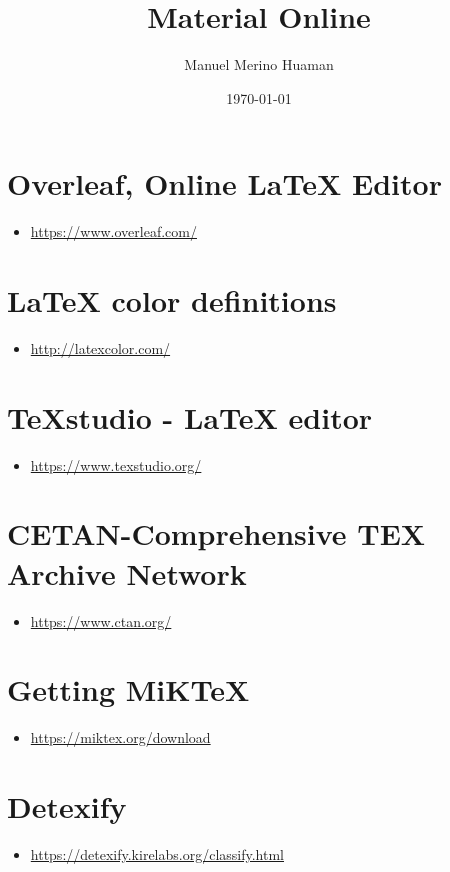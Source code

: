 \documentclass[11pt,a4paper]{article}
\title{Material Online}
\author{Manuel Merino Huaman}
\date{\today}
\begin{document}
     \maketitle
     \begin{abstract}
         \lipsum[1]
     \end{abstract}
   
     \section{Overleaf, Online LaTeX Editor}
         \begin{itemize}
             \item \textcolor{blue!85}{\url{https://www.overleaf.com/}}
         \end{itemize}
   
     \section{LaTeX color definitions}
         \begin{itemize}
             \item \textcolor{blue!85}{\url{http://latexcolor.com/}}
         \end{itemize}

     \section{TeXstudio - LaTeX editor}
         \begin{itemize}
             \item \textcolor{blue!85}{\url{https://www.texstudio.org/}}
         \end{itemize}
   
     \section{CETAN-Comprehensive TEX Archive Network}
         \begin{itemize}
             \item \textcolor{blue!85}{\url{https://www.ctan.org/}}
         \end{itemize}
   
     \section{Getting MiKTeX}
         \begin{itemize}
             \item \textcolor{blue!85}{\url{https://miktex.org/download}}
         \end{itemize}
         
     \section{Detexify}
         \begin{itemize}
             \item \textcolor{blue!85}{\url{https://detexify.kirelabs.org/classify.html}}
         \end{itemize}
\end{document}
